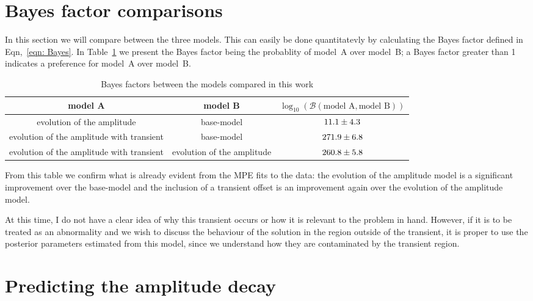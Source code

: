 \documentclass{article}
\begin{document}
\section{Bayes factor comparisons}
In this section we will compare between the three models. This can easily be
done quantitatevly by calculating the Bayes factor defined in Eqn,~\eqref{eqn: Bayes}.
In Table~\ref{tab: bayes factors} we present the Bayes factor being the probablity
of model~A over model~B; a Bayes factor greater than 1 indicates a preference for
model~A over model~B.
\begin{table}
\centering
\caption{Bayes factors between the models compared in this work}
\label{tab: bayes factors}
\begin{tabular}{ccc} \hhline{===}
model A & model B & $\log_{10}(\mathcal{B}(\textrm{model A}, \textrm{model B}))$\\ \hline
evolution of the amplitude & base-model &
$ 11.1 \pm
  4.3$\\
evolution of the amplitude with transient & base-model &
$ 271.9 \pm
  6.8$ \\
evolution of the amplitude with transient & evolution of the amplitude &
$ 260.8 \pm
  5.8$
\end{tabular}
\end{table}
From this table we confirm what is already evident from the MPE fits to the
data: the evolution of the amplitude model is a significant improvement over
the base-model and the inclusion of a transient offset is an improvement again
over the evolution of the amplitude model.

At this time, I do not have a clear idea of why this transient occurs or how it
is relevant to the problem in hand. However, if it is to be treated as an
abnormality and we wish to discuss the behaviour of the solution in the region
outside of the transient, it is proper to use the posterior parameters
estimated from this model, since we understand how they are contaminated by the
transient region.

\section{Predicting the amplitude decay}
\label{sec: predictions}
\end{document}
